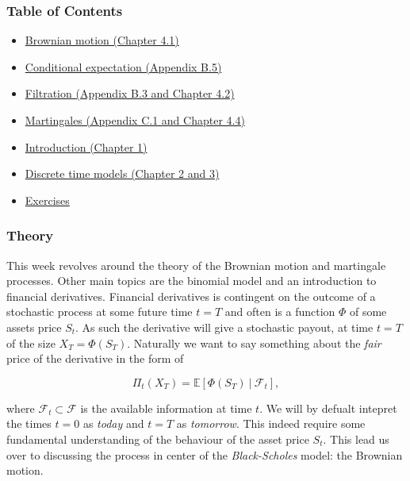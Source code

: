 \documentclass[
]{article}
\begin{document}
\hypertarget{table-of-contents}{%
\subsubsection{Table of Contents}\label{table-of-contents}}

\begin{itemize}
\item
  \protect\hyperlink{the-brownian-motion}{Brownian motion (Chapter 4.1)}
\item
  \protect\hyperlink{conditional-expectation}{Conditional expectation
  (Appendix B.5)}
\item
  \protect\hyperlink{filtrations}{Filtration (Appendix B.3 and Chapter
  4.2)}
\item
  \protect\hyperlink{martingales}{Martingales (Appendix C.1 and Chapter
  4.4)}
\item
  \protect\hyperlink{discrete-time-models}{Introduction (Chapter 1)}
\item
  \protect\hyperlink{discrete-time-models}{Discrete time models (Chapter
  2 and 3)}
\item
  \protect\hyperlink{exercises-week-1}{Exercises}
\end{itemize}

\hypertarget{theory}{%
\subsubsection{Theory}\label{theory}}

This week revolves around the theory of the Brownian motion and
martingale processes. Other main topics are the binomial model and an
introduction to financial derivatives. Financial derivatives is
contingent on the outcome of a stochastic process at some future time
\(t=T\) and often is a function \(\Phi\) of some assets price \(S_t\).
As such the derivative will give a stochastic payout, at time \(t=T\) of
the size \(X_T=\Phi(S_T)\). Naturally we want to say something about the
\emph{fair} price of the derivative in the form of

\[\Pi_t(X_T)=\mathbb{E}\left[\Phi(S_T)\ \vert\ \mathcal{F}_t\right],\]

where \(\mathcal{F}_t\subset\mathcal{F}\) is the available information
at time \(t\). We will by defualt intepret the times \(t=0\) as
\emph{today} and \(t=T\) as \emph{tomorrow}. This indeed require some
fundamental understanding of the behaviour of the asset price \(S_t\).
This lead us over to discussing the process in center of the
\emph{Black-Scholes} model: the Brownian motion.
\end{document}
